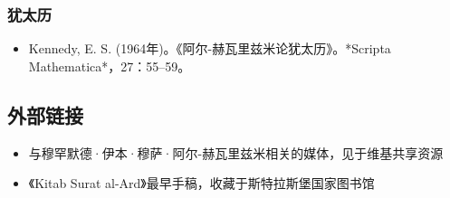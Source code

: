 \subsubsection{犹太历}  
\begin{itemize}
\item Kennedy, E. S. (1964年)。《阿尔-赫瓦里兹米论犹太历》。*Scripta Mathematica*，27：55–59。
\end{itemize}
\subsection{外部链接}
\begin{itemize}
\item 与穆罕默德·伊本·穆萨·阿尔-赫瓦里兹米相关的媒体，见于维基共享资源  
\item 《Kitab Surat al-Ard》最早手稿，收藏于斯特拉斯堡国家图书馆
\end{itemize}
